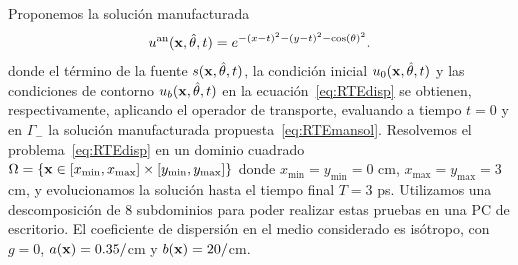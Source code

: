 Proponemos la solución manufacturada
\begin{equation*}
u^{\text{an}}(\mathbf{x},\hat{\theta},t)=e^{-(x-t)^2-(y-t)^2-\cos(\theta)^2}.
\label{eq:RTEmansol}
\end{equation*}
donde el término de la fuente $s(\mathbf{x},\hat{\theta},t)$, 
la condición inicial $u_0(\mathbf{x},\hat{\theta},t)$ y las condiciones 
de contorno $u_b(\mathbf{x},\hat{\theta},t)$ en la ecuación~\eqref{eq:RTEdisp} 
se obtienen, respectivamente, aplicando el operador de transporte, 
evaluando a tiempo $t=0$ y en $\Gamma_-$ la solución manufacturada 
propuesta~\eqref{eq:RTEmansol}.
Resolvemos el problema~\eqref{eq:RTEdisp} en un dominio cuadrado 
$\Omega=\{ \mathbf{x} \in [x_{\text{min}},x_{\text{max}}]\times [y_{\text{min}},y_{\text{max}}] \}$
donde $x_{\text{min}}=y_{\text{min}}=0$ cm, $x_{\text{max}}=y_{\text{max}}=3$ cm, 
y evolucionamos la solución hasta el tiempo final $T=3$ ps. Utilizamos 
una descomposición de 8 subdominios para 
poder realizar estas pruebas en una PC de escritorio. 
El coeficiente de dispersión en el medio considerado es isótropo, 
con $g=0$, $a(\mathbf{x})=0.35/$cm y $b(\mathbf{x})=20/$cm. 
